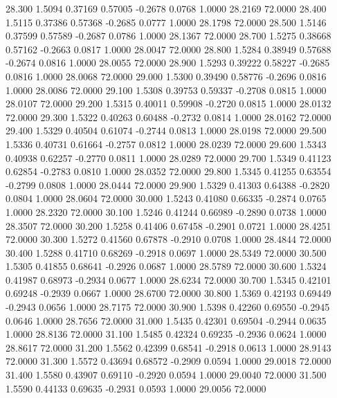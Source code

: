   28.300   1.5094   0.37169   0.57005  -0.2678   0.0768   1.0000  28.2169  72.0000
  28.400   1.5115   0.37386   0.57368  -0.2685   0.0777   1.0000  28.1798  72.0000
  28.500   1.5146   0.37599   0.57589  -0.2687   0.0786   1.0000  28.1367  72.0000
  28.700   1.5275   0.38668   0.57162  -0.2663   0.0817   1.0000  28.0047  72.0000
  28.800   1.5284   0.38949   0.57688  -0.2674   0.0816   1.0000  28.0055  72.0000
  28.900   1.5293   0.39222   0.58227  -0.2685   0.0816   1.0000  28.0068  72.0000
  29.000   1.5300   0.39490   0.58776  -0.2696   0.0816   1.0000  28.0086  72.0000
  29.100   1.5308   0.39753   0.59337  -0.2708   0.0815   1.0000  28.0107  72.0000
  29.200   1.5315   0.40011   0.59908  -0.2720   0.0815   1.0000  28.0132  72.0000
  29.300   1.5322   0.40263   0.60488  -0.2732   0.0814   1.0000  28.0162  72.0000
  29.400   1.5329   0.40504   0.61074  -0.2744   0.0813   1.0000  28.0198  72.0000
  29.500   1.5336   0.40731   0.61664  -0.2757   0.0812   1.0000  28.0239  72.0000
  29.600   1.5343   0.40938   0.62257  -0.2770   0.0811   1.0000  28.0289  72.0000
  29.700   1.5349   0.41123   0.62854  -0.2783   0.0810   1.0000  28.0352  72.0000
  29.800   1.5345   0.41255   0.63554  -0.2799   0.0808   1.0000  28.0444  72.0000
  29.900   1.5329   0.41303   0.64388  -0.2820   0.0804   1.0000  28.0604  72.0000
  30.000   1.5243   0.41080   0.66335  -0.2874   0.0765   1.0000  28.2320  72.0000
  30.100   1.5246   0.41244   0.66989  -0.2890   0.0738   1.0000  28.3507  72.0000
  30.200   1.5258   0.41406   0.67458  -0.2901   0.0721   1.0000  28.4251  72.0000
  30.300   1.5272   0.41560   0.67878  -0.2910   0.0708   1.0000  28.4844  72.0000
  30.400   1.5288   0.41710   0.68269  -0.2918   0.0697   1.0000  28.5349  72.0000
  30.500   1.5305   0.41855   0.68641  -0.2926   0.0687   1.0000  28.5789  72.0000
  30.600   1.5324   0.41987   0.68973  -0.2934   0.0677   1.0000  28.6234  72.0000
  30.700   1.5345   0.42101   0.69248  -0.2939   0.0667   1.0000  28.6700  72.0000
  30.800   1.5369   0.42193   0.69449  -0.2943   0.0656   1.0000  28.7175  72.0000
  30.900   1.5398   0.42260   0.69550  -0.2945   0.0646   1.0000  28.7656  72.0000
  31.000   1.5435   0.42301   0.69504  -0.2944   0.0635   1.0000  28.8136  72.0000
  31.100   1.5485   0.42324   0.69235  -0.2936   0.0624   1.0000  28.8617  72.0000
  31.200   1.5562   0.42399   0.68541  -0.2918   0.0613   1.0000  28.9143  72.0000
  31.300   1.5572   0.43694   0.68572  -0.2909   0.0594   1.0000  29.0018  72.0000
  31.400   1.5580   0.43907   0.69110  -0.2920   0.0594   1.0000  29.0040  72.0000
  31.500   1.5590   0.44133   0.69635  -0.2931   0.0593   1.0000  29.0056  72.0000

